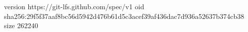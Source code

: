 version https://git-lfs.github.com/spec/v1
oid sha256:29f5f37aaf8bc56d5942d476b61d5c3acef39af436dac7d936a52637b374cb38
size 262240
